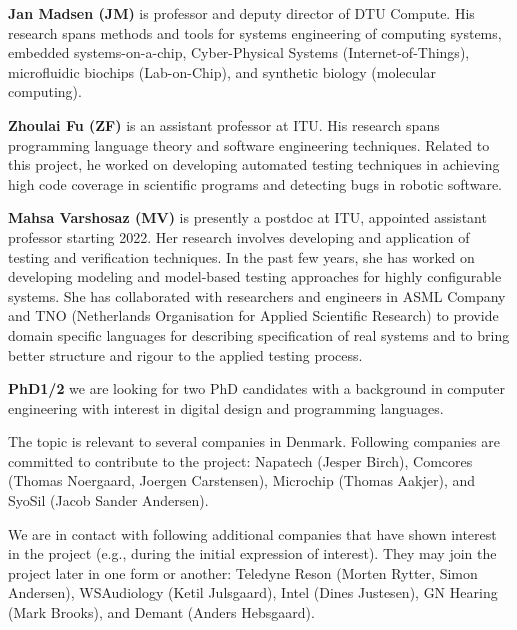 \documentclass[fleqn,12pt]{article}
\begin{document}
{\bf Jan Madsen (JM)} is professor and deputy director of DTU Compute.
His research spans methods
and tools for systems engineering of computing systems, embedded systems-on-a-chip,
Cyber-Physical Systems (Internet-of-Things), microfluidic biochips (Lab-on-Chip), and
synthetic biology (molecular computing).

{\bf Zhoulai Fu (ZF)} is an assistant professor at ITU. His research
spans programming language theory and software engineering
techniques. Related to this project, he worked on developing automated
testing techniques in achieving high code coverage in scientific
programs and detecting bugs in robotic software.

{\bf Mahsa Varshosaz (MV)} is presently a postdoc at ITU, appointed assistant professor starting 2022. Her research involves developing and application of testing and verification techniques. In the past few years, she has worked on developing modeling and model-based testing approaches for highly configurable systems. She has collaborated with researchers and engineers in ASML Company and TNO (Netherlands Organisation for Applied Scientific Research) to provide domain specific languages for describing specification of real systems and to bring better structure and rigour to the applied testing process.


{\bf PhD1/2} we are looking for two PhD candidates with a background in computer engineering
with interest in digital design and programming languages.

The topic is relevant to several companies in Denmark. Following companies are committed to contribute to the project: Napatech (Jesper Birch), Comcores (Thomas Noergaard, Joergen Carstensen), Microchip (Thomas Aakjer), and SyoSil (Jacob Sander Andersen).


We are in contact with following additional companies that have shown interest in
the project (e.g., during the initial expression of interest).
They may join the project later in one form or another:
Teledyne Reson (Morten Rytter, Simon Andersen), WSAudiology (Ketil Julsgaard),
Intel (Dines Justesen), GN Hearing (Mark Brooks), and Demant (Anders Hebsgaard).
\end{document}
